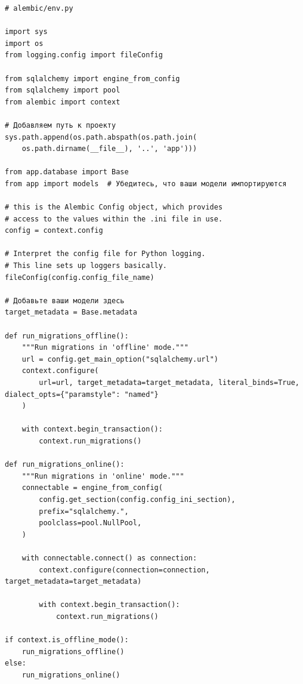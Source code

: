 \documentclass[coursework]{SCWorks}
\begin{document}
\begin{verbatim}
# alembic/env.py

import sys
import os
from logging.config import fileConfig

from sqlalchemy import engine_from_config
from sqlalchemy import pool
from alembic import context

# Добавляем путь к проекту
sys.path.append(os.path.abspath(os.path.join(
    os.path.dirname(__file__), '..', 'app')))

from app.database import Base
from app import models  # Убедитесь, что ваши модели импортируются

# this is the Alembic Config object, which provides
# access to the values within the .ini file in use.
config = context.config

# Interpret the config file for Python logging.
# This line sets up loggers basically.
fileConfig(config.config_file_name)

# Добавьте ваши модели здесь
target_metadata = Base.metadata

def run_migrations_offline():
    """Run migrations in 'offline' mode."""
    url = config.get_main_option("sqlalchemy.url")
    context.configure(
        url=url, target_metadata=target_metadata, literal_binds=True, dialect_opts={"paramstyle": "named"}
    )

    with context.begin_transaction():
        context.run_migrations()

def run_migrations_online():
    """Run migrations in 'online' mode."""
    connectable = engine_from_config(
        config.get_section(config.config_ini_section),
        prefix="sqlalchemy.",
        poolclass=pool.NullPool,
    )

    with connectable.connect() as connection:
        context.configure(connection=connection, target_metadata=target_metadata)

        with context.begin_transaction():
            context.run_migrations()

if context.is_offline_mode():
    run_migrations_offline()
else:
    run_migrations_online()
\end{verbatim}
\end{document}

